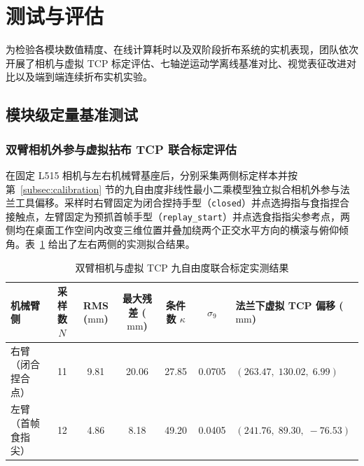 \section{测试与评估}
\label{sec:evaluation}

为检验各模块数值精度、在线计算耗时以及双阶段折布系统的实机表现，团队依次开展了相机与虚拟 TCP 标定评估、七轴逆运动学离线基准对比、视觉表征改进对比以及端到端连续折布实机实验。

\subsection{模块级定量基准测试}
\label{subsec:module-benchmarks}

\subsubsection{双臂相机外参与虚拟拈布 TCP 联合标定评估}

在固定 L515 相机与左右机械臂基座后，分别采集两侧标定样本并按第~\ref{subsec:calibration} 节的九自由度非线性最小二乘模型独立拟合相机外参与法兰工具偏移。采样时右臂固定为闭合捏持手型（\texttt{closed}）并点选拇指与食指捏合接触点，左臂固定为预抓首帧手型（\texttt{replay\_start}）并点选食指指尖参考点，两侧均在桌面工作空间内改变三维位置并叠加绕两个正交水平方向的横滚与俯仰倾角。表~\ref{tab:calib-results} 给出了左右两侧的实测拟合结果。

\begin{table}[htbp]
\centering
\caption{双臂相机与虚拟 TCP 九自由度联合标定实测结果}
\label{tab:calib-results}
\footnotesize
\setlength{\tabcolsep}{4pt}
\begin{tabular}{@{}lcccccl@{}}
  \toprule
  机械臂侧 & 采样数 $N$ & RMS ($\mathrm{mm}$) & 最大残差 ($\mathrm{mm}$) & 条件数 $\kappa$ & $\sigma_9$ & 法兰下虚拟 TCP 偏移 ($\mathrm{mm}$) \\
  \midrule
  右臂（闭合捏合点） & 11 & 9.81 & 20.06 & 27.85 & 0.0705 & $(263.47,\; 130.02,\; 6.99)$ \\
  左臂（首帧食指尖） & 12 & 4.86 &  8.18 & 49.20 & 0.0405 & $(241.76,\; 89.30,\; -76.53)$ \\
  \bottomrule
\end{tabular}
\end{table}


